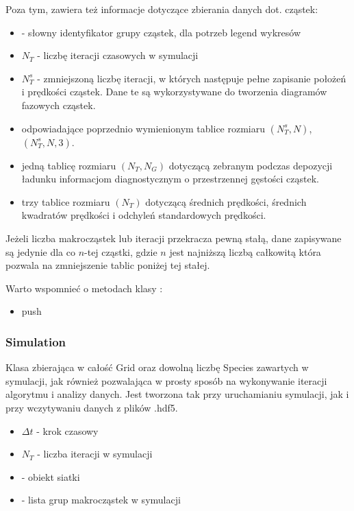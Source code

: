     Poza tym, zawiera też informacje dotyczące zbierania danych dot. cząstek:
    \begin{itemize}
        \item {} - słowny identyfikator grupy cząstek, dla potrzeb legend wykresów
        \item $N_T$ - liczbę iteracji czasowych w symulacji
        \item $N_T^s$ - zmniejszoną liczbę iteracji, w których następuje pełne zapisanie położeń i prędkości cząstek.
            Dane te są wykorzystywane do tworzenia diagramów fazowych cząstek.
        \item odpowiadające poprzednio wymienionym tablice rozmiaru $(N_T^s, N)$, $(N_T^s, N, 3)$.
        \item jedną tablicę rozmiaru $(N_T, N_G)$ dotyczącą zebranym podczas depozycji ładunku informacjom diagnostycznym
            o przestrzennej gęstości cząstek.
        \item trzy tablice rozmiaru $(N_T)$ dotyczącą średnich prędkości, średnich kwadratów prędkości i odchyleń
            standardowych prędkości.
    \end{itemize}

    Jeżeli liczba makrocząstek lub iteracji przekracza pewną stałą, dane zapisywane są jedynie dla co $n$-tej cząstki,
    gdzie $n$ jest najniższą liczbą całkowitą która pozwala na zmniejszenie tablic poniżej tej stałej.

    Warto wspomnieć o metodach klasy :
    \begin{itemize}
        \item push 
    \end{itemize}

    \subsubsection{Simulation}
    Klasa zbierająca w całość Grid oraz dowolną liczbę Species zawartych w symulacji, jak również
    pozwalająca w prosty sposób na wykonywanie iteracji algorytmu i analizy danych. Jest tworzona tak przy
    uruchamianiu symulacji, jak i przy wczytywaniu danych z plików .hdf5.

    \begin{itemize}
        \item $\Delta t$ - krok czasowy
        \item $N_T$ - liczba iteracji w symulacji
        \item {} - obiekt siatki
        \item {} - lista grup makrocząstek w symulacji
    \end{itemize}

